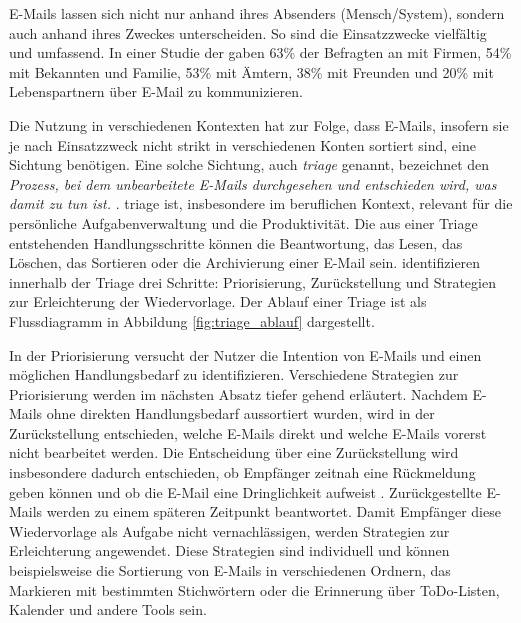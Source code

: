 E-Mails lassen sich nicht nur anhand ihres Absenders (Mensch/System), sondern auch anhand ihres Zweckes unterscheiden. So sind die Einsatzzwecke vielfältig und umfassend. In einer Studie der \cite{MMG2020} gaben 63\% der Befragten an mit Firmen, 54\% mit Bekannten und Familie, 53\% mit Ämtern, 38\% mit Freunden und 20\% mit Lebenspartnern über E-Mail zu kommunizieren.

Die Nutzung in verschiedenen Kontexten hat zur Folge, dass E-Mails, insofern sie je nach Einsatzzweck nicht strikt in verschiedenen Konten sortiert sind, eine Sichtung benötigen. Eine solche Sichtung, auch \textit{\gls{triage}} genannt, bezeichnet den \emph{\glqq[...] Prozess, bei dem unbearbeitete E-Mails durchgesehen und entschieden wird, was damit zu tun ist.\grqq{}} \citep[S. 325]{Sarrafzadeh2019}. \gls{triage} ist, insbesondere im beruflichen Kontext, relevant für die persönliche Aufgabenverwaltung und die Produktivität. Die aus einer Triage entstehenden Handlungsschritte können die Beantwortung, das Lesen, das Löschen, das Sortieren oder die Archivierung einer E-Mail sein. \cite{Sarrafzadeh2019} identifizieren innerhalb der Triage drei Schritte: Priorisierung, Zurückstellung und Strategien zur Erleichterung der Wiedervorlage. Der Ablauf einer Triage ist als Flussdiagramm in Abbildung \ref{fig:triage_ablauf} dargestellt.

In der Priorisierung versucht der Nutzer die Intention von E-Mails und einen möglichen Handlungsbedarf zu identifizieren. Verschiedene Strategien zur Priorisierung werden im nächsten Absatz tiefer gehend erläutert. Nachdem E-Mails ohne direkten Handlungsbedarf aussortiert wurden, wird in der Zurückstellung entschieden, welche E-Mails direkt und welche E-Mails vorerst nicht bearbeitet werden. Die Entscheidung über eine Zurückstellung wird insbesondere dadurch entschieden, ob Empfänger zeitnah eine Rückmeldung geben können und ob die E-Mail eine Dringlichkeit aufweist \citep[S. 327]{Sarrafzadeh2019}. Zurückgestellte E-Mails werden zu einem späteren Zeitpunkt beantwortet. Damit Empfänger diese Wiedervorlage als Aufgabe nicht vernachlässigen, werden Strategien zur Erleichterung angewendet. Diese Strategien sind individuell und können beispielsweise die Sortierung von E-Mails in verschiedenen Ordnern, das Markieren mit bestimmten Stichwörtern oder die Erinnerung über ToDo-Listen, Kalender und andere Tools sein.

